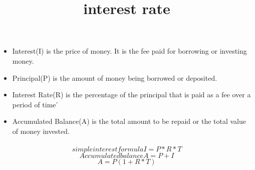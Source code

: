 \documentclass{article}
\begin{document}
\title{interest rate}
\begin{itemize}
	\item Interest(I) is the price of money. It is the fee paid for borrowing or investing money.
	\item Principal(P) is the amount of money being borrowed or deposited.
	\item Interest Rate(R) is the percentage of the principal that is paid as a fee over a period of time'
	\item Accumulated Balance(A) is the total amount to be repaid or the total value of money invested.
\end{itemize}

\paragraph{}
\begin{equation}
simple interest formula I = P*R*T
\end{equation}
\begin{equation}
Accumulated balance A = P + I
\end{equation}
\begin{equation}
A = P(1 + R*T)
\end{equation}
\end{document}
